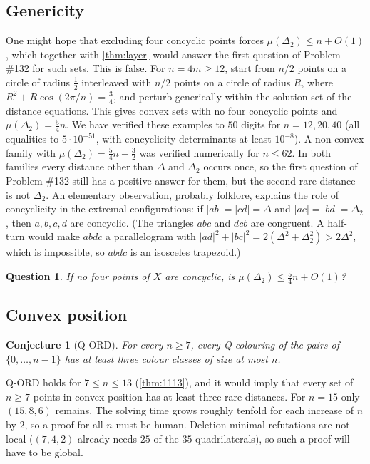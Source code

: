 \documentclass[11pt]{amsart}
\newtheorem{conjecture}[theorem]{Conjecture}
\newtheorem{question}[theorem]{Question}
\theoremstyle{definition}
\theoremstyle{remark}
\newcommand{\Dt}{\Delta_2}
\newcommand{\mult}{\mu}
\begin{document}
\subsection*{Genericity}
One might hope that excluding four concyclic points forces $\mult(\Dt)\le n+O(1)$, which together with \cref{thm:layer} would answer the first question of Problem \#132 for such sets. This is false. For $n=4m\ge12$, start from $n/2$ points on a circle of radius $\frac12$ interleaved with $n/2$ points on a circle of radius $R$, where $R^2+R\cos(2\pi/n)=\frac34$, and perturb generically within the solution set of the distance equations. This gives convex sets with no four concyclic points and $\mult(\Dt)=\frac54n$. We have verified these examples to $50$ digits for $n=12,20,40$ (all equalities to $5\cdot10^{-51}$, with concyclicity determinants at least $10^{-8}$). A non-convex family with $\mult(\Dt)=\frac54n-\frac32$ was verified numerically for $n\le62$. In both families every distance other than $\Delta$ and $\Dt$ occurs once, so the first question of Problem \#132 still has a positive answer for them, but the second rare distance is not $\Dt$. An elementary observation, probably folklore, explains the role of concyclicity in the extremal configurations: if $|ab|=|cd|=\Delta$ and $|ac|=|bd|=\Dt$, then $a,b,c,d$ are concyclic. (The triangles $abc$ and $dcb$ are congruent. A half-turn would make $abdc$ a parallelogram with $|ad|^2+|bc|^2=2(\Delta^2+\Dt^2)>2\Delta^2$, which is impossible, so $abdc$ is an isosceles trapezoid.)
\begin{question}\label{q:genericity}
If no four points of $X$ are concyclic, is $\mult(\Dt)\le\frac54n+O(1)$?
\end{question}

\subsection*{Convex position}
\begin{conjecture}[Q-ORD]\label{conj:QORD}
For every $n\ge7$, every Q-colouring of the pairs of $\{0,\dots,n-1\}$ has at least three colour classes of size at most $n$.
\end{conjecture}
Q-ORD holds for $7\le n\le13$ (\cref{thm:1113}), and it would imply that every set of $n\ge7$ points in convex position has at least three rare distances. For $n=15$ only $(15,8,6)$ remains. The solving time grows roughly tenfold for each increase of $n$ by $2$, so a proof for all $n$ must be human. Deletion-minimal refutations are not local ($(7,4,2)$ already needs $25$ of the $35$ quadrilaterals), so such a proof will have to be global.
\end{document}
